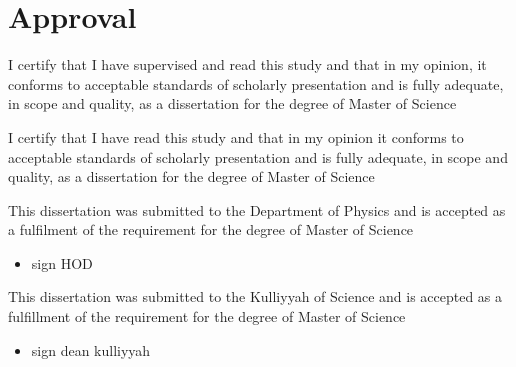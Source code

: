 \section*{Approval}

\noindent I certify that I have supervised and read this study and that in my opinion, it conforms to acceptable standards of scholarly presentation and is fully adequate, in scope and quality, as a dissertation for the degree of Master of Science 



\vspace{0.5cm}

\noindent I certify that I have read this study and that in my opinion it conforms to acceptable standards of scholarly presentation and is fully adequate, in scope and quality, as a dissertation for the degree of Master of Science


\vspace{0.5cm}

\noindent This dissertation was submitted to the Department of Physics and is accepted as a fulfilment of the requirement for the degree of Master of Science

\begin{itemize}
    \item sign HOD
\end{itemize}

\noindent This dissertation was submitted to the Kulliyyah of Science and is accepted as a
fulfillment of the requirement for the degree of Master of Science

\begin{itemize}
    \item sign dean kulliyyah
\end{itemize}